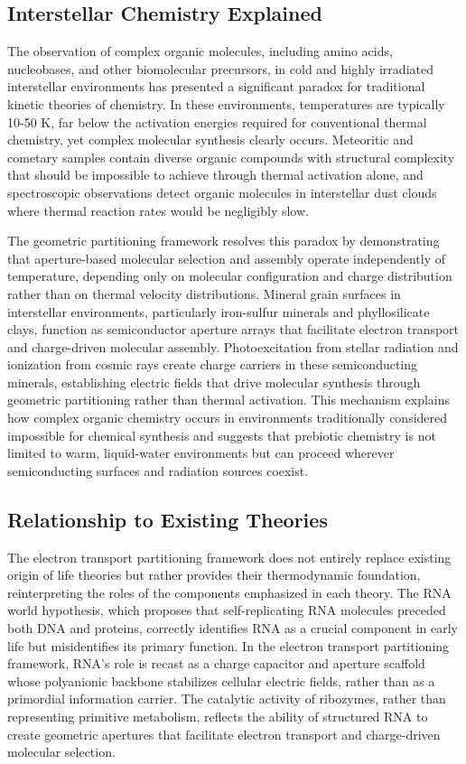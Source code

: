 \documentclass[12pt,a4paper]{article}
\begin{document}
\subsection{Interstellar Chemistry Explained}

The observation of complex organic molecules, including amino acids, nucleobases, and other biomolecular precursors, in cold and highly irradiated interstellar environments has presented a significant paradox for traditional kinetic theories of chemistry. In these environments, temperatures are typically 10-50 K, far below the activation energies required for conventional thermal chemistry, yet complex molecular synthesis clearly occurs. Meteoritic and cometary samples contain diverse organic compounds with structural complexity that should be impossible to achieve through thermal activation alone, and spectroscopic observations detect organic molecules in interstellar dust clouds where thermal reaction rates would be negligibly slow.

The geometric partitioning framework resolves this paradox by demonstrating that aperture-based molecular selection and assembly operate independently of temperature, depending only on molecular configuration and charge distribution rather than on thermal velocity distributions. Mineral grain surfaces in interstellar environments, particularly iron-sulfur minerals and phyllosilicate clays, function as semiconductor aperture arrays that facilitate electron transport and charge-driven molecular assembly. Photoexcitation from stellar radiation and ionization from cosmic rays create charge carriers in these semiconducting minerals, establishing electric fields that drive molecular synthesis through geometric partitioning rather than thermal activation. This mechanism explains how complex organic chemistry occurs in environments traditionally considered impossible for chemical synthesis and suggests that prebiotic chemistry is not limited to warm, liquid-water environments but can proceed wherever semiconducting surfaces and radiation sources coexist.

\subsection{Relationship to Existing Theories}

The electron transport partitioning framework does not entirely replace existing origin of life theories but rather provides their thermodynamic foundation, reinterpreting the roles of the components emphasized in each theory. The RNA world hypothesis, which proposes that self-replicating RNA molecules preceded both DNA and proteins, correctly identifies RNA as a crucial component in early life but misidentifies its primary function. In the electron transport partitioning framework, RNA's role is recast as a charge capacitor and aperture scaffold whose polyanionic backbone stabilizes cellular electric fields, rather than as a primordial information carrier. The catalytic activity of ribozymes, rather than representing primitive metabolism, reflects the ability of structured RNA to create geometric apertures that facilitate electron transport and charge-driven molecular selection.
\end{document}
